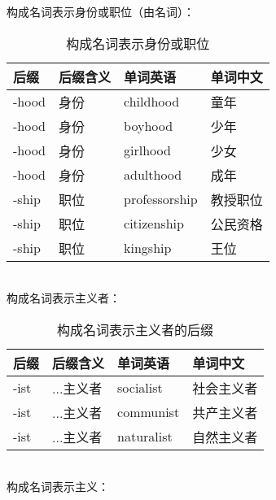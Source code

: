\documentclass[UTF8]{ctexart}
\begin{document}
\newpage

    构成名词表示身份或职位（由名词）：\vspace{5pt}
    \begin{table}[h!]
        \begin{center}
            \ttfamily
            \begin{tabular}{p{40pt}|p{80pt}|p{80pt}|p{80pt}}
                \hline
                后缀&后缀含义&单词英语&单词中文\\ \hline
                -hood&身份&childhood&童年\\ \hline
                -hood&身份&boyhood&少年\\ \hline
                -hood&身份&girlhood&少女\\ \hline
                -hood&身份&adulthood&成年\\ \hline
                -ship&职位&professorship&教授职位\\ \hline
                -ship&职位&citizenship&公民资格\\ \hline
                -ship&职位&kingship&王位\\ \hline
            \end{tabular}
            \rmfamily
            \caption{构成名词表示身份或职位}
        \end{center}
    \end{table}\\
    构成名词表示主义者：\vspace{5pt}
    \begin{table}[h!]
        \begin{center}
            \ttfamily
            \begin{tabular}{p{40pt}|p{80pt}|p{80pt}|p{80pt}}
                \hline
                后缀&后缀含义&单词英语&单词中文\\ \hline
                -ist&...主义者&socialist&社会主义者\\ \hline
                -ist&...主义者&communist&共产主义者\\ \hline
                -ist&...主义者&naturalist&自然主义者\\ \hline
            \end{tabular}
            \rmfamily
            \caption{构成名词表示主义者的后缀}
        \end{center}
    \end{table}\\
    构成名词表示主义：\vspace{5pt}
\end{document}
